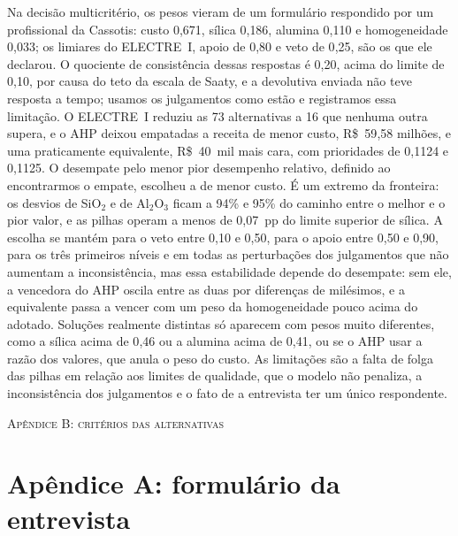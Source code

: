 \documentclass[conference]{IEEEtran}
\begin{document}
Na decisão multicritério, os pesos vieram de um formulário respondido por um profissional da Cassotis: custo 0{,}671, sílica 0{,}186, alumina 0{,}110 e homogeneidade 0{,}033; os limiares do ELECTRE~I, apoio de 0{,}80 e veto de 0{,}25, são os que ele declarou. O quociente de consistência dessas respostas é 0{,}20, acima do limite de 0{,}10, por causa do teto da escala de Saaty, e a devolutiva enviada não teve resposta a tempo; usamos os julgamentos como estão e registramos essa limitação. O ELECTRE~I reduziu as 73 alternativas a 16 que nenhuma outra supera, e o AHP deixou empatadas a receita de menor custo, R\$~59{,}58 milhões, e uma praticamente equivalente, R\$~40~mil mais cara, com prioridades de 0{,}1124 e 0{,}1125. O desempate pelo menor pior desempenho relativo, definido ao encontrarmos o empate, escolheu a de menor custo. É um extremo da fronteira: os desvios de SiO$_2$ e de Al$_2$O$_3$ ficam a 94\% e 95\% do caminho entre o melhor e o pior valor, e as pilhas operam a menos de 0{,}07~pp do limite superior de sílica. A escolha se mantém para o veto entre 0{,}10 e 0{,}50, para o apoio entre 0{,}50 e 0{,}90, para os três primeiros níveis e em todas as perturbações dos julgamentos que não aumentam a inconsistência, mas essa estabilidade depende do desempate: sem ele, a vencedora do AHP oscila entre as duas por diferenças de milésimos, e a equivalente passa a vencer com um peso da homogeneidade pouco acima do adotado. Soluções realmente distintas só aparecem com pesos muito diferentes, como a sílica acima de 0{,}46 ou a alumina acima de 0{,}41, ou se o AHP usar a razão dos valores, que anula o peso do custo. As limitações são a falta de folga das pilhas em relação aos limites de qualidade, que o modelo não penaliza, a inconsistência dos julgamentos e o fato de a entrevista ter um único respondente.


\begin{table}[!t]
\centering
{\normalsize\scshape Apêndice B: critérios das alternativas}\\[1.2ex]
\caption{Critérios das 73 alternativas avaliadas pelo ELECTRE~I: custo $f_1$ (R\$ milhões), desvios $f_2$ e $f_3$ (pp$^2$), homogeneidade $H$, nível no ELECTRE~I e prioridade global $g$ do AHP, para as que seguiram para o AHP. A escolhida pelo AHP está em negrito}
\centering
\scriptsize

\label{tab:apendice}
\end{table}

\section*{Apêndice A: formulário da entrevista}
\end{document}
